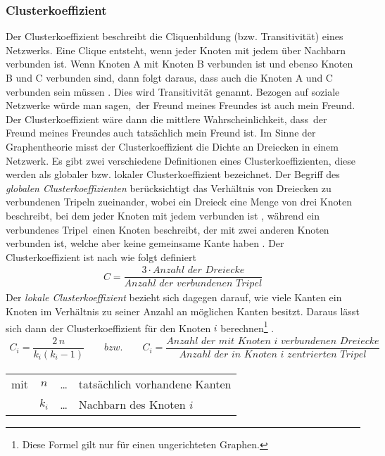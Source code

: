 \documentclass[fontsize=11pt, twoside, a4paper]{scrartcl}
\begin{document}
\subsubsection*{Clusterkoeffizient}
Der Clusterkoeffizient beschreibt die Cliquenbildung (bzw. Transitivität) eines Netzwerks. Eine Clique entsteht, wenn jeder Knoten mit jedem über Nachbarn verbunden ist. Wenn Knoten A mit Knoten B verbunden ist und ebenso Knoten B und C verbunden sind, dann folgt daraus, dass auch die Knoten A und C verbunden sein müssen \cite{Newman}. Dies wird Transitivität genannt. Bezogen auf soziale Netzwerke würde man sagen,\, \glqq der Freund meines Freundes ist auch mein Freund\grqq. Der Clusterkoeffizient wäre dann die mittlere Wahrscheinlichkeit, dass\, \glqq der Freund meines Freundes auch tatsächlich mein Freund ist\grqq . Im Sinne der Graphentheorie misst der Clusterkoeffizient die Dichte an Dreiecken in einem Netzwerk. Es gibt zwei verschiedene Definitionen eines Clusterkoeffizienten, diese werden als globaler bzw. lokaler Clusterkoeffizient bezeichnet. Der Begriff des \textit{globalen Clusterkoeffizienten} berücksichtigt das Verhältnis von Dreiecken zu verbundenen Tripeln zueinander, wobei ein Dreieck eine Menge von drei Knoten beschreibt, bei dem jeder Knoten mit jedem verbunden ist \cite{Newman}, während ein \glqq verbundenes Tripel\grqq \, einen Knoten beschreibt, der mit zwei anderen Knoten verbunden ist, welche aber keine gemeinsame Kante haben \cite{Newman}. Der Clusterkoeffizient ist nach \cite{Boccaletti} wie folgt definiert
\begin{align}
	C = \dfrac{3 \cdot Anzahl \,\, der \,\, Dreiecke}{Anzahl\,\, der\,\, verbundenen\,\, Tripel}
	\label{C1}
\end{align}  
Der \textit{lokale Clusterkoeffizient} bezieht sich dagegen darauf, wie viele Kanten ein Knoten im Verhältnis zu seiner Anzahl an möglichen Kanten besitzt. Daraus lässt sich dann der Clusterkoeffizient für den Knoten $i$ berechnen\footnote{Diese Formel gilt nur für einen ungerichteten Graphen.} \cite{Watts,Newman}.
\begin{align}
C_{i} = \dfrac{2\, n}{k_{i}(k_{i} - 1)} \qquad bzw.\qquad C_{i} = \dfrac{Anzahl \,\,der \,\,mit\,\, Knoten\,\, i \,\, verbundenen \,\, Dreiecke}{Anzahl\,\, der\,\, in\,\,Knoten\,\, i\,\, zentrierten\,\, Tripel} 
\end{align}
\begin{table}[H]
\begin{tabular}{rccl}
mit  & $n$ & \ldots & tatsächlich vorhandene Kanten\\
	 & $k_{i}$ & \ldots & Nachbarn des Knoten $i$\\
\end{tabular}
\end{table}
\end{document}
